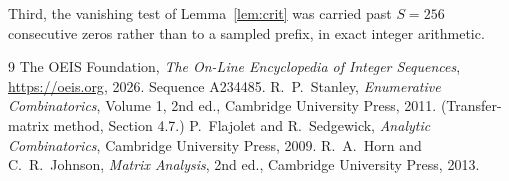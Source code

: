 \documentclass[11pt,a4paper]{article}
\theoremstyle{plain}
\theoremstyle{definition}
\begin{document}
Third, the vanishing test of Lemma~\ref{lem:crit} was carried past $S=256$ consecutive
zeros rather than to a sampled prefix, in exact integer arithmetic.

\begin{thebibliography}{9}
 The OEIS Foundation, \emph{The On-Line Encyclopedia of Integer
Sequences}, \url{https://oeis.org}, 2026. Sequence A234485.
 R.~P.~Stanley, \emph{Enumerative Combinatorics}, Volume 1, 2nd ed.,
Cambridge University Press, 2011. (Transfer-matrix method, Section 4.7.)
 P.~Flajolet and R.~Sedgewick, \emph{Analytic Combinatorics}, Cambridge
University Press, 2009.
 R.~A.~Horn and C.~R.~Johnson, \emph{Matrix Analysis}, 2nd ed., Cambridge
University Press, 2013.
\end{thebibliography}
\end{document}

